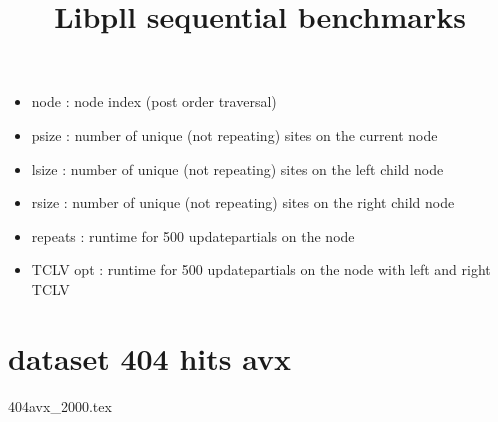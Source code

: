 \documentclass[a4paper]{article}
\begin{document}
\newcommand*{\figuretitle}[1]{%
    {\centering%
    \textbf{#1}%
    \par\medskip}%
}


\title{Libpll sequential benchmarks}
\maketitle


\begin{itemize}
\item node : node index (post order traversal)
\item psize : number of unique (not repeating) sites on the current node
\item lsize : number of unique (not repeating) sites on the left child node
\item rsize : number of unique (not repeating) sites on the right child node
\item repeats : runtime for 500 updatepartials on the node
\item TCLV opt : runtime for 500 updatepartials on the node with left and right TCLV
\end{itemize}


\section{dataset 404 hits avx}
{404avx_2000.tex}
%
\end{document}

